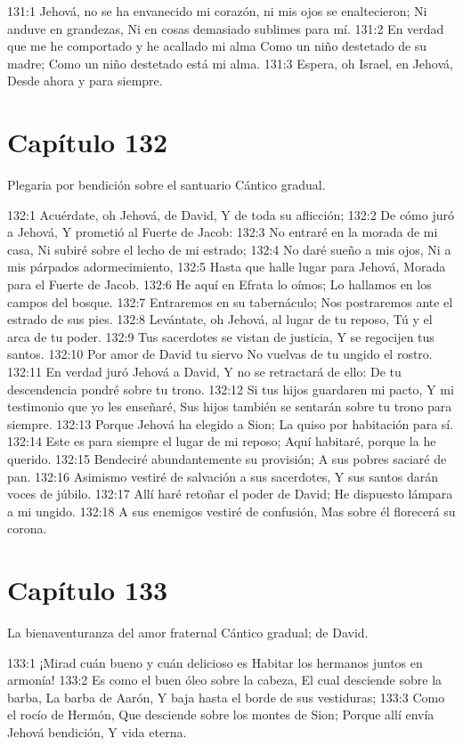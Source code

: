 131:1 Jehová, no se ha envanecido mi corazón, ni mis ojos se enaltecieron; 
Ni anduve en grandezas, 
Ni en cosas demasiado sublimes para mí. 
131:2 En verdad que me he comportado y he acallado mi alma 
Como un niño destetado de su madre; 
Como un niño destetado está mi alma. 
131:3 Espera, oh Israel, en Jehová, 
Desde ahora y para siempre. 
\section*{Capítulo 132}
Plegaria por bendición sobre el santuario 
Cántico gradual. 
 
132:1 Acuérdate, oh Jehová, de David, 
Y de toda su aflicción; 
132:2 De cómo juró a Jehová, 
Y prometió al Fuerte de Jacob: 
132:3 No entraré en la morada de mi casa, 
Ni subiré sobre el lecho de mi estrado; 
132:4 No daré sueño a mis ojos, 
Ni a mis párpados adormecimiento, 
132:5 Hasta que halle lugar para Jehová, 
Morada para el Fuerte de Jacob. 
132:6 He aquí en Efrata lo oímos; 
Lo hallamos en los campos del bosque. 
132:7 Entraremos en su tabernáculo; 
Nos postraremos ante el estrado de sus pies. 
132:8 Levántate, oh Jehová, al lugar de tu reposo, 
Tú y el arca de tu poder. 
132:9 Tus sacerdotes se vistan de justicia, 
Y se regocijen tus santos. 
132:10 Por amor de David tu siervo 
No vuelvas de tu ungido el rostro. 
132:11 En verdad juró Jehová a David, 
Y no se retractará de ello: 
De tu descendencia pondré sobre tu trono. 
132:12 Si tus hijos guardaren mi pacto, 
Y mi testimonio que yo les enseñaré, 
Sus hijos también se sentarán sobre tu trono para siempre. 
132:13 Porque Jehová ha elegido a Sion; 
La quiso por habitación para sí. 
132:14 Este es para siempre el lugar de mi reposo; 
Aquí habitaré, porque la he querido. 
132:15 Bendeciré abundantemente su provisión; 
A sus pobres saciaré de pan. 
132:16 Asimismo vestiré de salvación a sus sacerdotes, 
Y sus santos darán voces de júbilo. 
132:17 Allí haré retoñar el poder de David; 
He dispuesto lámpara a mi ungido. 
132:18 A sus enemigos vestiré de confusión, 
Mas sobre él florecerá su corona. 
\section*{Capítulo 133}
La bienaventuranza del amor fraternal 
Cántico gradual; de David. 
 
133:1 ¡Mirad cuán bueno y cuán delicioso es 
Habitar los hermanos juntos en armonía! 
133:2 Es como el buen óleo sobre la cabeza, 
El cual desciende sobre la barba, 
La barba de Aarón, 
Y baja hasta el borde de sus vestiduras; 
133:3 Como el rocío de Hermón, 
Que desciende sobre los montes de Sion; 
Porque allí envía Jehová bendición, 
Y vida eterna. 
